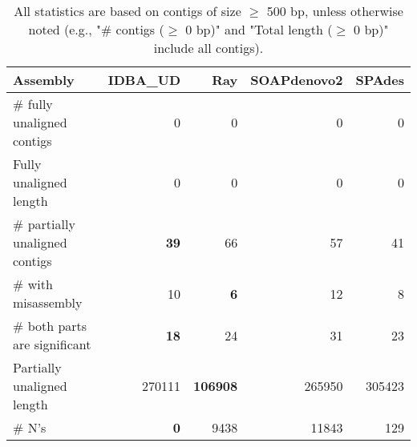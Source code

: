 \documentclass[12pt,a4paper]{article}
\begin{document}
\begin{table}[ht]
\begin{center}
\caption{All statistics are based on contigs of size $\geq$ 500 bp, unless otherwise noted (e.g., "\# contigs ($\geq$ 0 bp)" and "Total length ($\geq$ 0 bp)" include all contigs).}
\begin{tabular}{|l*{4}{|r}|}
\hline
Assembly & IDBA\_UD & Ray & SOAPdenovo2 & SPAdes \\ \hline
\# fully unaligned contigs & 0 & 0 & 0 & 0 \\ \hline
Fully unaligned length & 0 & 0 & 0 & 0 \\ \hline
\# partially unaligned contigs & {\bf 39} & 66 & 57 & 41 \\ \hline
\hspace{5mm}\# with misassembly & 10 & {\bf 6} & 12 & 8 \\ \hline
\hspace{5mm}\# both parts are significant & {\bf 18} & 24 & 31 & 23 \\ \hline
Partially unaligned length & 270111 & {\bf 106908} & 265950 & 305423 \\ \hline
\# N's & {\bf 0} & 9438 & 11843 & 129 \\ \hline
\end{tabular}
\end{center}
\end{table}
\end{document}
